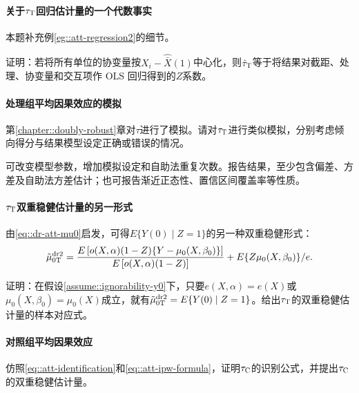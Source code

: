  
\paragraph{关于$\tau_\textsc{T}$回归估计量的一个代数事实} 
 \label{para::regression-att-algebra}
 
 本题补充例\ref{eg::att-regression2}的细节。 
 
证明：若将所有单位的协变量按$X_i - \hat{\bar{X}}(1)$中心化，则$\hat{\tau}_\textsc{T} $等于将结果对截距、处理、协变量和交互项作 OLS 回归得到的$Z$系数。 
 
 
 
 \paragraph{处理组平均因果效应的模拟}

第\ref{chapter::doubly-robust}章对$\tau$进行了模拟。请对$\tau_\textsc{T}$进行类似模拟，分别考虑倾向得分与结果模型设定正确或错误的情况。 

可改变模型参数，增加模拟设定和自助法重复次数。报告结果，至少包含偏差、方差及自助法方差估计；也可报告渐近正态性、置信区间覆盖率等性质。 



\paragraph{$\tau_\textsc{T}$双重稳健估计量的另一形式}\label{hw::alternative-dr2-robins-att}

由\eqref{eq::dr-att-mu0}启发，可得$ E\{ Y(0) \mid Z=1 \}  $的另一种双重稳健形式：
$$
\tilde{\mu}_{0\textsc{T}}^\text{dr2} = 
\frac{  E\left[ o(X,\alpha)   (1-Z) \{ Y - \mu_0(X, \beta_0) \}  \right] }{  E\left[ o(X,\alpha)   (1-Z) \right] } 
  + E\{  Z  \mu_0(X, \beta_0) \} /e.
$$

证明：在假设\ref{assume::ignorability-y0}下，只要$e(X,\alpha)  = e(X)$或$\mu_0(X, \beta_0) =  \mu_0(X)$成立，就有$\tilde{\mu}_{0\textsc{T}}^\text{dr2}= E\{ Y(0) \mid Z=1 \}$。给出$\tau_\textsc{T}$的双重稳健估计量的样本对应式。 

 



 \paragraph{对照组平均因果效应}\label{hw::formulas-atc}

仿照\eqref{eq::att-identification}和\eqref{eq::att-ipw-formula}，证明$\tau_\textsc{C}$的识别公式，并提出$\tau_\textsc{C}$的双重稳健估计量。 


